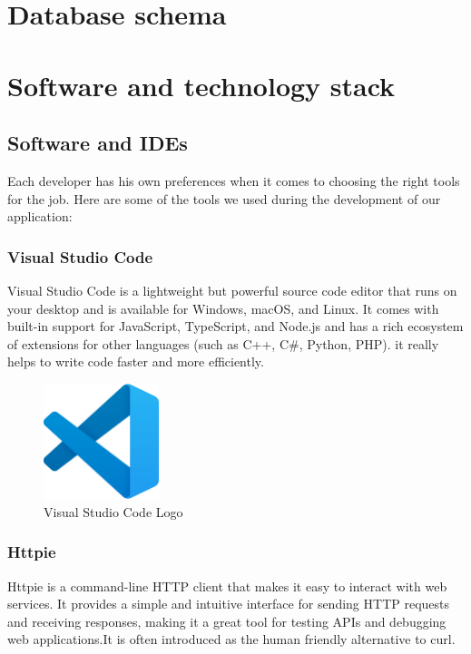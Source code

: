 \section{Database schema}

\section{Software and technology stack}

\subsection{Software and IDEs}
Each developer has his own preferences when it comes to choosing the right
tools for the job. Here are some of the tools we used during the development of
our application:
\subsubsection{Visual Studio Code}

Visual Studio Code is a lightweight but powerful source code editor that runs
on your desktop and is available for Windows, macOS, and Linux. It comes with
built-in support for JavaScript, TypeScript, and Node.js and has a rich
ecosystem of extensions for other languages (such as C++, C\#, Python, PHP). it really
helps to write code faster and more efficiently.
\begin{figure}[h!]
      \centering
      \includegraphics[width=0.3\textwidth]{images/vscode.png}
      \caption{Visual Studio Code Logo}
      \label{fig:vscode}
\end{figure}

\subsubsection{Httpie}

Httpie is a command-line HTTP client that makes it easy to interact with web
services. It provides a simple and intuitive interface for sending HTTP
requests and receiving responses, making it a great tool for testing APIs and
debugging web applications.It is often introduced as the human friendly alternative to curl.

